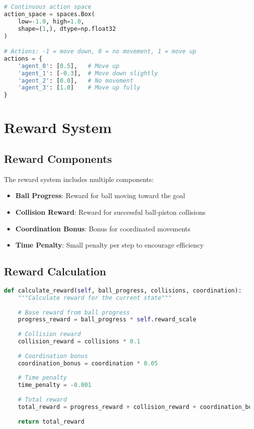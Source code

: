 \begin{lstlisting}[language=python, caption=Continuous Actions]
# Continuous action space
action_space = spaces.Box(
    low=-1.0, high=1.0, 
    shape=(1,), dtype=np.float32
)

# Actions: -1 = move down, 0 = no movement, 1 = move up
actions = {
    'agent_0': [0.5],   # Move up
    'agent_1': [-0.3],  # Move down slightly
    'agent_2': [0.0],   # No movement
    'agent_3': [1.0]    # Move up fully
}
\end{lstlisting}

\section{Reward System}

\subsection{Reward Components}

The reward system includes multiple components:

\begin{itemize}
    \item \textbf{Ball Progress}: Reward for ball moving toward the goal
    \item \textbf{Collision Reward}: Reward for successful ball-piston collisions
    \item \textbf{Coordination Bonus}: Bonus for coordinated movements
    \item \textbf{Time Penalty}: Small penalty per step to encourage efficiency
\end{itemize}

\subsection{Reward Calculation}

\begin{lstlisting}[language=python, caption=Reward Calculation]
def calculate_reward(self, ball_progress, collisions, coordination):
    """Calculate reward for the current state"""
    
    # Base reward from ball progress
    progress_reward = ball_progress * self.reward_scale
    
    # Collision reward
    collision_reward = collisions * 0.1
    
    # Coordination bonus
    coordination_bonus = coordination * 0.05
    
    # Time penalty
    time_penalty = -0.001
    
    # Total reward
    total_reward = progress_reward + collision_reward + coordination_bonus + time_penalty
    
    return total_reward
\end{lstlisting}

